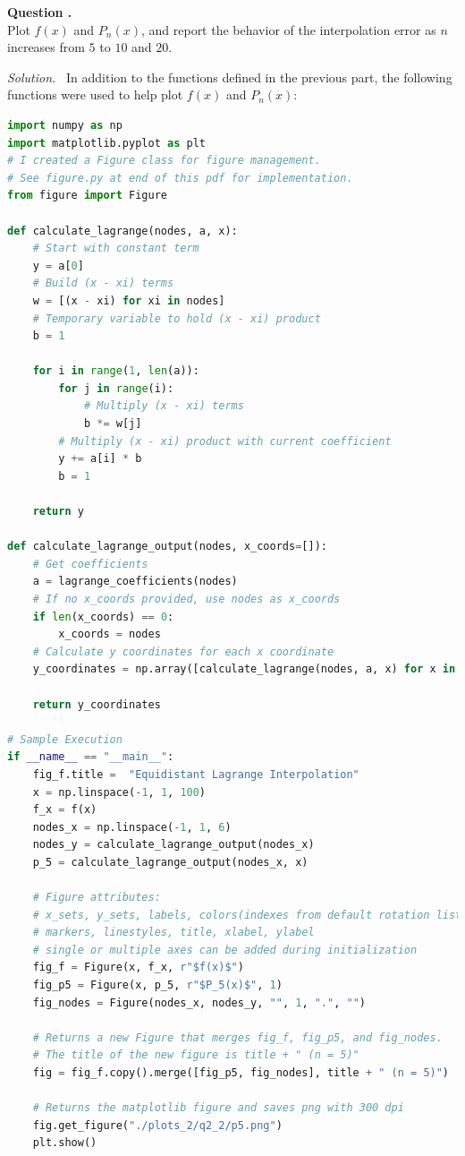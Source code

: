 \documentclass[12pt]{article}
\newcounter{question}
\newcounter{subquest}
\newcommand{\subquestion}{
    \stepcounter{subquest} 
    \vspace{.5em}
    \textbf{\large Question \thequestion.\thesubquest}
    \vspace{.25em}\ \\}
\newcommand{\solution}
    {\par\vspace{0.5em}\noindent\emph{Solution.}\ }
    {\par\vspace{1em}}
\begin{document}
\newpage
\subquestion
Plot $f(x)$ and $P_n(x)$, and report the behavior of the interpolation error as $n$ increases from $5$ to $10$ and $20$.

\solution 
In addition to the functions defined in the previous part, the following functions were used to help plot $f(x)$ and $P_n(x)$:

\begin{lstlisting}[language=Python, caption=2.2 Python]
import numpy as np
import matplotlib.pyplot as plt
# I created a Figure class for figure management.
# See figure.py at end of this pdf for implementation.
from figure import Figure

def calculate_lagrange(nodes, a, x):
    # Start with constant term
    y = a[0]
    # Build (x - xi) terms
    w = [(x - xi) for xi in nodes]
    # Temporary variable to hold (x - xi) product
    b = 1

    for i in range(1, len(a)):
        for j in range(i):
            # Multiply (x - xi) terms
            b *= w[j]
        # Multiply (x - xi) product with current coefficient
        y += a[i] * b
        b = 1

    return y

def calculate_lagrange_output(nodes, x_coords=[]):
    # Get coefficients
    a = lagrange_coefficients(nodes)
    # If no x_coords provided, use nodes as x_coords
    if len(x_coords) == 0:
        x_coords = nodes
    # Calculate y coordinates for each x coordinate
    y_coordinates = np.array([calculate_lagrange(nodes, a, x) for x in x_coords])

    return y_coordinates

# Sample Execution
if __name__ == "__main__":
    fig_f.title =  "Equidistant Lagrange Interpolation"
    x = np.linspace(-1, 1, 100)
    f_x = f(x)
    nodes_x = np.linspace(-1, 1, 6)
    nodes_y = calculate_lagrange_output(nodes_x)
    p_5 = calculate_lagrange_output(nodes_x, x)

    # Figure attributes: 
    # x_sets, y_sets, labels, colors(indexes from default rotation list), 
    # markers, linestyles, title, xlabel, ylabel
    # single or multiple axes can be added during initialization
    fig_f = Figure(x, f_x, r"$f(x)$")
    fig_p5 = Figure(x, p_5, r"$P_5(x)$", 1)
    fig_nodes = Figure(nodes_x, nodes_y, "", 1, ".", "")

    # Returns a new Figure that merges fig_f, fig_p5, and fig_nodes.
    # The title of the new figure is title + " (n = 5)" 
    fig = fig_f.copy().merge([fig_p5, fig_nodes], title + " (n = 5)")

    # Returns the matplotlib figure and saves png with 300 dpi
    fig.get_figure("./plots_2/q2_2/p5.png")
    plt.show()
\end{lstlisting}
\end{document}
